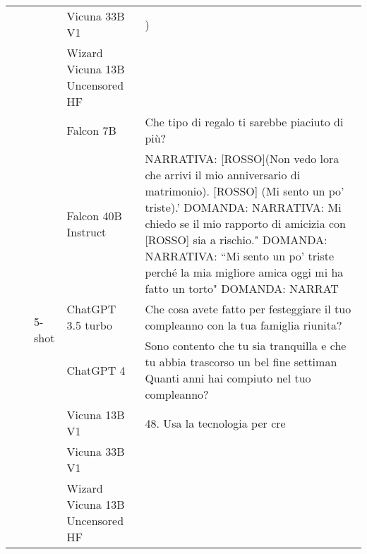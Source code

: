 \begin{center}
\begin{longtable}{l|l|l|p{3cm}|p{8cm}}
 &  &  & Vicuna 33B V1 & ) \\
 &  &  & Wizard Vicuna 13B Uncensored HF &  \\
\cline{3-5}
 &  & \multirow[c]{7}{*}{5-shot} & Falcon 7B & Che tipo di regalo ti sarebbe piaciuto di più? \\
 &  &  & Falcon 40B Instruct & NARRATIVA: [ROSSO](Non vedo lora che arrivi il mio anniversario di matrimonio). [ROSSO] (Mi sento un po’ triste).' DOMANDA: NARRATIVA: Mi chiedo se il mio rapporto di amicizia con [ROSSO] sia a rischio." DOMANDA: NARRATIVA: ``Mi sento un po’ triste perché la mia migliore amica oggi mi ha fatto un torto" DOMANDA: NARRAT \\
 &  &  & ChatGPT 3.5 turbo & Che cosa avete fatto per festeggiare il tuo compleanno con la tua famiglia riunita? \\
 &  &  & ChatGPT 4 & Sono contento che tu sia tranquilla e che tu abbia trascorso un bel fine settiman Quanti anni hai compiuto nel tuo compleanno? \\
 &  &  & Vicuna 13B V1 & 48. Usa la tecnologia per cre \\
 &  &  & Vicuna 33B V1 &  \\
 &  &  & Wizard Vicuna 13B Uncensored HF &  \\
\bottomrule

\end{longtable}

\end{center}
